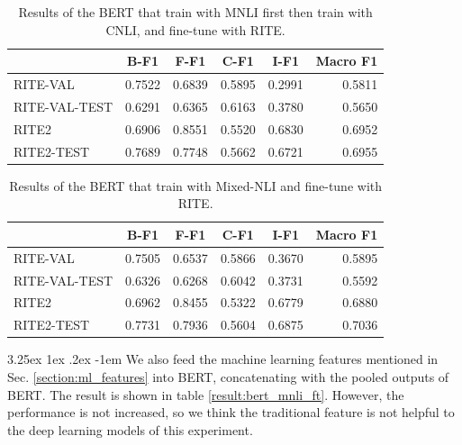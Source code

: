 \documentclass[12pt]{article}
\makeatletter
\renewcommand\paragraph{\@startsection{paragraph}{5}{\z@}%
  {3.25ex \@plus1ex \@minus.2ex}%
  {-1em}%
  {\normalfont\normalsize\bfseries}}
\makeatother
\begin{document}
\begin{CJK*}{UTF8}{bkai}
\begin{spacing}{1.77}
\begin{table}[H]
  \centering
  \setlength{\extrarowheight}{-3pt}
  \begin{tabular}{|l|r|r|r|r|r|}
  \hline
   & \multicolumn{1}{c|}{B-F1} & \multicolumn{1}{c|}{F-F1} & \multicolumn{1}{c|}{C-F1} & \multicolumn{1}{c|}{I-F1} & \multicolumn{1}{c|}{Macro F1} \\ \hline
  RITE-VAL & 0.7522 & 0.6839 & 0.5895 & 0.2991 & 0.5811 \\ \hline
  RITE-VAL-TEST & 0.6291 & 0.6365 & 0.6163 & 0.3780 & 0.5650 \\ \hline
  RITE2 & 0.6906 & 0.8551 & 0.5520 & 0.6830 & 0.6952 \\ \hline
  RITE2-TEST & 0.7689 & 0.7748 & 0.5662 & 0.6721 & 0.6955 \\ \hline
  \end{tabular}
  \caption{Results of the BERT that train with MNLI first then train with CNLI, and fine-tune with RITE.}
  \label{result:bert_mnli_cnli}
\end{table}

\begin{table}[H]
  \centering
  \setlength{\extrarowheight}{-3pt}
  \begin{tabular}{|l|r|r|r|r|r|}
  \hline
   & \multicolumn{1}{c|}{B-F1} & \multicolumn{1}{c|}{F-F1} & \multicolumn{1}{c|}{C-F1} & \multicolumn{1}{c|}{I-F1} & \multicolumn{1}{c|}{Macro F1} \\ \hline
  RITE-VAL & 0.7505 & 0.6537 & 0.5866 & 0.3670 & 0.5895 \\ \hline
  RITE-VAL-TEST & 0.6326 & 0.6268 & 0.6042 & 0.3731 & 0.5592 \\ \hline
  RITE2 & 0.6962 & 0.8455 & 0.5322 & 0.6779 & 0.6880 \\ \hline
  RITE2-TEST & 0.7731 & 0.7936 & 0.5604 & 0.6875 & 0.7036 \\ \hline
  \end{tabular}
  \caption{Results of the BERT that train with Mixed-NLI and fine-tune with RITE.}
  \label{result:bert_mixed_nli}
\end{table}

\paragraph{}
We also feed the machine learning features mentioned in Sec. \ref{section:ml_features} into BERT, concatenating with the pooled outputs of BERT. The result is shown in table \ref{result:bert_mnli_ft}. However, the performance is not increased, so we think the traditional feature is not helpful to the deep learning models of this experiment.


\end{spacing}
\end{CJK*}
\end{document}
